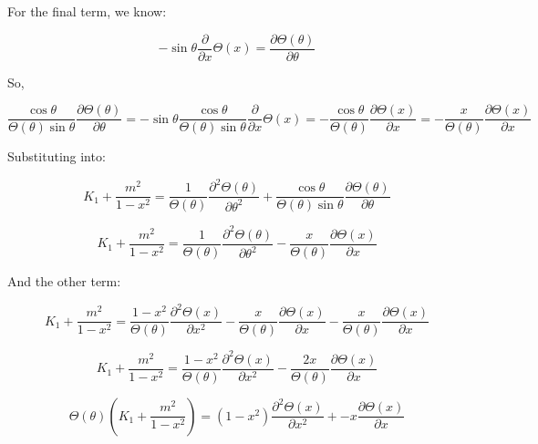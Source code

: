 \documentclass[12pt]{article}
\renewcommand{\_}{\kern-1.5pt\textunderscore\kern-1.5pt}
\begin{document}
For the final term, we know:\par

 \[ -\sin  \theta \frac{ \partial }{ \partial x} \Theta  \left( x \right) =\frac{ \partial  \Theta  \left(  \theta  \right) }{ \partial  \theta } \] \par

So,\par

 \[ \frac{\cos  \theta }{ \Theta  \left(  \theta  \right) \sin  \theta }\frac{ \partial  \Theta  \left(  \theta  \right) }{ \partial  \theta }=-\sin  \theta \frac{\cos  \theta }{ \Theta  \left(  \theta  \right) \sin  \theta }\frac{ \partial }{ \partial x} \Theta  \left( x \right) =-\frac{\cos  \theta }{ \Theta  \left(  \theta  \right) }\frac{ \partial  \Theta  \left( x \right) }{ \partial x}=-\frac{x}{ \Theta  \left(  \theta  \right) }\frac{ \partial  \Theta  \left( x \right) }{ \partial x} \] \par

Substituting into:\par

 \[ K_{1}+\frac{m^{2}}{1-x^{2}}=\frac{1}{ \Theta  \left(  \theta  \right) }\frac{ \partial ^{2} \Theta  \left(  \theta  \right) }{ \partial  \theta ^{2}}+\frac{\cos  \theta }{ \Theta  \left(  \theta  \right) \sin  \theta }\frac{ \partial  \Theta  \left(  \theta  \right) }{ \partial  \theta } \] \par

 \[ K_{1}+\frac{m^{2}}{1-x^{2}}=\frac{1}{ \Theta  \left(  \theta  \right) }\frac{ \partial ^{2} \Theta  \left(  \theta  \right) }{ \partial  \theta ^{2}}-\frac{x}{ \Theta  \left(  \theta  \right) }\frac{ \partial  \Theta  \left( x \right) }{ \partial x} \] \par

And the other term:\par
\[
K_{1}+\frac{m^{2}}{1-x^{2}}=\frac{1-x^{2}}{\Theta(\theta)}\frac{\partial^{2}\Theta(x)}{\partial x^{2}}-\frac{x}{\Theta(\theta)}\frac{\partial\Theta(x)}{\partial x}-\frac{x}{\Theta(\theta)}\frac{\partial\Theta(x)}{\partial x}
\]

\[
K_{1}+\frac{m^{2}}{1-x^{2}}=\frac{1-x^{2}}{\Theta(\theta)}\frac{\partial^{2}\Theta(x)}{\partial x^{2}}-\frac{2x}{\Theta(\theta)}\frac{\partial\Theta(x)}{\partial x}
\]

\[
\Theta(\theta)(K_{1}+\frac{m^{2}}{1-x^{2}})=(1-x^{2})\frac{\partial^{2}\Theta(x)}{\partial x^{2}}+-x\frac{\partial\Theta(x)}{\partial x}
\]
\end{document}
